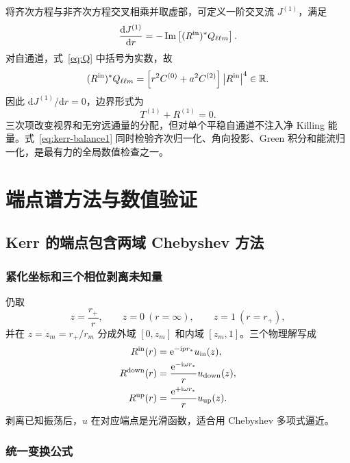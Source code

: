 \documentclass[UTF8,fontset=fandol,12pt,a4paper,oneside,openany]{ctexrep}
\newcommand{\dd}{\mathrm d}
\newcommand{\ii}{\mathrm i}
\newcommand{\ee}{\mathrm e}
\newcommand{\abs}[1]{\left|#1\right|}
\newcommand{\Imm}{\operatorname{Im}}
\begin{document}
将齐次方程与非齐次方程交叉相乘并取虚部，可定义一阶交叉流 $J^{(1)}$，满足
\begin{equation}
\frac{\dd J^{(1)}}{\dd r}
=-\Imm\left[(R^{\rm in})^*Q_{\ell\ell m}\right].
\label{eq:cross-current}
\end{equation}
对自通道，式~\eqref{eq:Q} 中括号为实数，故
\begin{equation}
(R^{\rm in})^*Q_{\ell\ell m}
=\left[r^2C^{(0)}+a^2C^{(2)}\right]\abs{R^{\rm in}}^4
\in\mathbb R.
\end{equation}
因此 $\dd J^{(1)}/\dd r=0$，边界形式为
\begin{equation}
\boxed{T^{(1)}+R^{(1)}=0.}
\label{eq:kerr-balance1}
\end{equation}
三次项改变视界和无穷远通量的分配，但对单个平稳自通道不注入净 Killing 能量。式~\eqref{eq:kerr-balance1} 同时检验齐次归一化、角向投影、Green 积分和能流归一化，是最有力的全局数值检查之一。

\chapter{端点谱方法与数值验证}
\section{Kerr 的端点包含两域 Chebyshev 方法}
\label{sec:kerr-spectral}

\subsection{紧化坐标和三个相位剥离未知量}

仍取
\begin{equation}
z=\frac{r_+}{r},\qquad z=0\ (r=\infty),\qquad z=1\ (r=r_+),
\label{eq:kerr-z}
\end{equation}
并在 $z=z_m=r_+/r_m$ 分成外域 $[0,\allowbreak z_m]$ 和内域 $[z_m,\allowbreak 1]$。三个物理解写成
\begin{align}
R^{\rm in}(r)&=\ee^{-\ii p r_*}u_{\rm in}(z),\\
R^{\rm down}(r)&=\frac{\ee^{-\ii\omega r_*}}{r}u_{\rm down}(z),\\
R^{\rm up}(r)&=\frac{\ee^{+\ii\omega r_*}}{r}u_{\rm up}(z).
\label{eq:kerr-peeling}
\end{align}
剥离已知振荡后，$u$ 在对应端点是光滑函数，适合用 Chebyshev 多项式逼近。

\subsection{统一变换公式}
\end{document}

